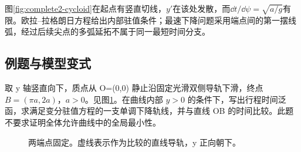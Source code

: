 图\ref{fig:complete2-cycloid}在起点有竖直切线，$y'$在该处发散，而$\dd t/\dd\psi=\sqrt{a/g}$有限。欧拉--拉格朗日方程给出内部驻值条件；最速下降问题采用端点间的第一摆线弧，经过后续尖点的多弧延拓不属于同一最短时间分支。





\subsection{例题与模型变式}

\begin{example}[下降导轨的变分候选（选做）]\label{sup2:problem-exercise-11}\label{sup2:exercise:d2-h11}

取 y 轴竖直向下，质点从 O=(0,0) 静止沿固定光滑双侧导轨下滑，终点 $B=(\pi a,2a)$，$a>0$。见图\ref{sup2:fig:d2-h11-q}。在曲线内部 $y>0$ 的条件下，写出行程时间泛函，求满足变分驻值方程的一支单调下降轨线，并与直线 OB 的时间比较。此题不要求证明全体允许曲线中的全局最小性。

\end{example}
\begin{figure}[H]\centering
{}
\caption{两端点固定。虚线表示作为比较的直线导轨，y 正向朝下。}\label{sup2:fig:d2-h11-q}
\end{figure}
\par\medskip

